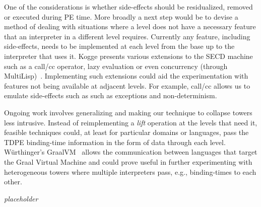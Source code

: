 \documentclass[sigplan,anonymous,review]{acmart}
\newcommand{\mevl}{$M_{e}$}
\theoremstyle{definition}
\begin{document}
One of the considerations is whether side-effects should be residualized, removed or executed during PE time. More broadly a next step would be to devise a method of dealing with situations where a level does not have a necessary feature that an interpreter in a different level requires.
Currently any feature, including side-effects, needs to be implemented at each level from the base up to the interpreter that uses it.
Kogge presents various extensions to the SECD machine such as a call/cc operator, lazy evaluation or even concurrency (through MultiLisp)~\cite{kogge1990architecture}. Implementing such extensions could aid the experimentation with features not being available at adjacent levels. For example, call/cc allows us to emulate side-effects such as such as exceptions and non-determinism.



Ongoing work involves generalizing and making our technique to collapse towers less intrusive. Instead of reimplementing a \textit{lift} operation at the levels that need it, feasible techniques could, at least for particular domains or languages, pass the TDPE binding-time information in the form of data through each level. W{\"u}rthinger's GraalVM~\cite{wurthinger2013one} allows the communication between languages that target the Graal Virtual Machine and could prove useful in further experimenting with heterogeneous towers where multiple interpreters pass, e.g., binding-times to each other.

\begin{acks}
\textit{placeholder}
\end{acks}




\end{document}
